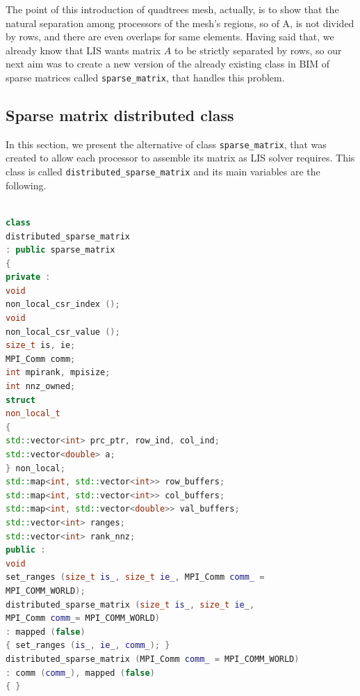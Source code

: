 The point of this introduction of quadtrees mesh, actually, is to show that the natural separation among processors of the mesh's regions, so of A, is not divided by rows, and there are even overlaps for same elements. Having said that, we already know that LIS wants matrix $ A $ to be strictly separated by rows, so our next aim was to create a new version of the already existing class in BIM of sparse matrices called \texttt{sparse\_matrix}, that handles this problem.
\subsection{Sparse matrix distributed class}
In this section, we present the alternative of class \texttt{sparse\_matrix}, that was created to allow each processor to assemble its matrix as LIS solver requires. This class is called \texttt{distributed\_sparse\_matrix} and its main variables are the following. 
\\
\\
\begin{lstlisting}[language=C++, caption={class distributed\_sparse\_matrix}]
class
distributed_sparse_matrix
: public sparse_matrix
{
private :
void
non_local_csr_index ();
void
non_local_csr_value ();
size_t is, ie;
MPI_Comm comm;
int mpirank, mpisize;
int nnz_owned;
struct
non_local_t
{
std::vector<int> prc_ptr, row_ind, col_ind;
std::vector<double> a;
} non_local;
std::map<int, std::vector<int>> row_buffers;
std::map<int, std::vector<int>> col_buffers;
std::map<int, std::vector<double>> val_buffers;
std::vector<int> ranges;
std::vector<int> rank_nnz;
public :
void
set_ranges (size_t is_, size_t ie_, MPI_Comm comm_ =     
MPI_COMM_WORLD);
distributed_sparse_matrix (size_t is_, size_t ie_,
MPI_Comm comm_= MPI_COMM_WORLD)
: mapped (false)
{ set_ranges (is_, ie_, comm_); }
distributed_sparse_matrix (MPI_Comm comm_ = MPI_COMM_WORLD)
: comm (comm_), mapped (false)
{ }
\end{lstlisting}

